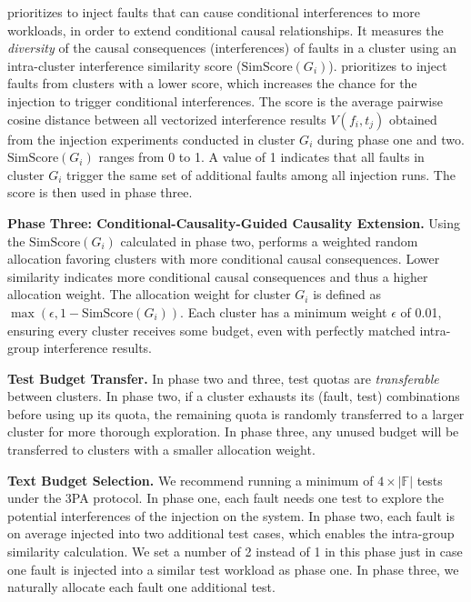 \tool prioritizes to 
inject faults that can cause conditional interferences 
to more workloads, 
in order to extend conditional causal relationships. 
It measures the 
\textit{diversity} 
of the causal consequences (interferences) 
of faults in a cluster 
using 
an intra-cluster 
interference similarity score ($\mathrm{SimScore}(G_i)$). 
\tool prioritizes to 
inject faults from clusters with a lower score, 
which increases the chance for the injection to trigger conditional interferences. 
The score is the average pairwise cosine distance between all vectorized interference results $V(f_i, t_j)$ obtained from the injection experiments conducted in cluster $G_i$ during phase one and two. 
$\mathrm{SimScore}(G_i)$ ranges from 0 to 1. 
A value of 1 indicates that all faults in cluster $G_i$ trigger the same set of additional faults among all injection runs.
The score is then used in phase three. 



\textbf{Phase Three: Conditional-Causality-Guided Causality Extension.}
Using the $\mathrm{SimScore}(G_i)$ calculated in phase two, 
\tool performs a weighted random allocation favoring clusters 
with more conditional causal consequences. 
Lower similarity indicates 
more conditional causal consequences 
and thus a higher allocation weight.
The allocation weight for cluster $G_i$ is defined as 
$\max{(\epsilon, 1-\mathrm{SimScore}(G_i))}$.
Each cluster has a minimum weight $\epsilon$ of 0.01, ensuring every cluster receives some budget, even with perfectly matched intra-group interference results.


\textbf{Test Budget Transfer.} 
In phase two and three, 
test quotas are \textit{transferable} between clusters. 
In phase two, 
if a cluster exhausts its (fault, test) combinations before using up its quota, the remaining quota is randomly transferred to a larger cluster for more thorough exploration.
In phase three, any unused budget will be transferred to clusters with a smaller allocation weight.

\textbf{Text Budget Selection.}
We recommend running a minimum of $4 \times |\mathbb{F}|$ tests under the 3PA protocol.
In phase one, each fault needs one test to explore the potential interferences of the injection on the system.
In phase two, each fault is on average injected into two additional test cases, which enables the intra-group similarity calculation. We set a number of 2 instead of 1 in this phase just in case one fault is injected into a similar test workload as phase one. 
In phase three, we naturally allocate each fault one additional test. 
